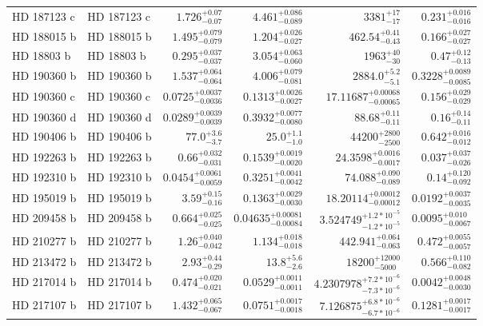 \begin{longtable*}{llrrrr}
HD 187123 c & HD 187123 c & $1.726^{+0.07}_{-0.07}$ & $4.461^{+0.086}_{-0.089}$ & $3381^{+17}_{-17}$ & $0.231^{+0.016}_{-0.016}$ \\ 
HD 188015 b & HD 188015 b & $1.495^{+0.079}_{-0.079}$ & $1.204^{+0.026}_{-0.027}$ & $462.54^{+0.41}_{-0.43}$ & $0.166^{+0.027}_{-0.027}$ \\ 
HD 18803 b & HD 18803 b & $0.295^{+0.037}_{-0.037}$ & $3.054^{+0.063}_{-0.060}$ & $1963^{+40}_{-30}$ & $0.47^{+0.12}_{-0.13}$ \\ 
HD 190360 b & HD 190360 b & $1.537^{+0.064}_{-0.064}$ & $4.006^{+0.079}_{-0.081}$ & $2884.0^{+5.2}_{-5.1}$ & $0.3228^{+0.0089}_{-0.0085}$ \\ 
HD 190360 c & HD 190360 c & $0.0725^{+0.0037}_{-0.0036}$ & $0.1313^{+0.0026}_{-0.0027}$ & $17.11687^{+0.00068}_{-0.00065}$ & $0.156^{+0.029}_{-0.029}$ \\ 
HD 190360 d & HD 190360 d & $0.0289^{+0.0039}_{-0.0039}$ & $0.3932^{+0.0077}_{-0.0080}$ & $88.68^{+0.11}_{-0.11}$ & $0.16^{+0.14}_{-0.11}$ \\ 
HD 190406 b & HD 190406 b & $77.0^{+3.6}_{-3.7}$ & $25.0^{+1.1}_{-1.0}$ & $44200^{+2800}_{-2500}$ & $0.642^{+0.016}_{-0.012}$ \\ 
HD 192263 b & HD 192263 b & $0.66^{+0.032}_{-0.031}$ & $0.1539^{+0.0019}_{-0.0020}$ & $24.3598^{+0.0016}_{-0.0017}$ & $0.037^{+0.037}_{-0.026}$ \\ 
HD 192310 b & HD 192310 b & $0.0454^{+0.0061}_{-0.0059}$ & $0.3251^{+0.0041}_{-0.0042}$ & $74.088^{+0.090}_{-0.089}$ & $0.14^{+0.120}_{-0.092}$ \\ 
HD 195019 b & HD 195019 b & $3.59^{+0.15}_{-0.16}$ & $0.1363^{+0.0029}_{-0.0030}$ & $18.20114^{+0.00012}_{-0.00012}$ & $0.0192^{+0.0037}_{-0.0035}$ \\ 
HD 209458 b & HD 209458 b & $0.664^{+0.025}_{-0.025}$ & $0.04635^{+0.00081}_{-0.00084}$ & $3.524749^{+1.2*10^{-5}}_{-1.2*10^{-5}}$ & $0.0095^{+0.010}_{-0.0067}$ \\ 
HD 210277 b & HD 210277 b & $1.26^{+0.040}_{-0.042}$ & $1.134^{+0.018}_{-0.018}$ & $442.941^{+0.064}_{-0.063}$ & $0.472^{+0.0055}_{-0.0057}$ \\ 
HD 213472 b & HD 213472 b & $2.93^{+0.44}_{-0.29}$ & $13.8^{+5.6}_{-2.6}$ & $18200^{+12000}_{-5000}$ & $0.566^{+0.110}_{-0.082}$ \\ 
HD 217014 b & HD 217014 b & $0.474^{+0.020}_{-0.021}$ & $0.0529^{+0.0011}_{-0.0011}$ & $4.2307978^{+7.2*10^{-6}}_{-7.3*10^{-6}}$ & $0.0042^{+0.0048}_{-0.0030}$ \\ 
HD 217107 b & HD 217107 b & $1.432^{+0.065}_{-0.067}$ & $0.0751^{+0.0017}_{-0.0018}$ & $7.126875^{+6.8*10^{-6}}_{-6.7*10^{-6}}$ & $0.1281^{+0.0017}_{-0.0017}$ \\ 

\end{longtable*}
